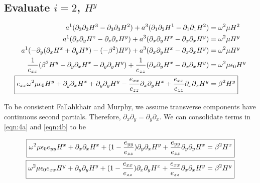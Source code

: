 \documentclass[letter]{article}
\begin{document}
	\subsection*{Evaluate $i=2$, $H^y$}
	
	\begin{align}
		a^1 (\partial_3 \partial_2 H^3 - \partial_3 \partial_3 H^2) + a^3 (\partial_1 \partial_2 H^1 - \partial_1 \partial_1 							H^2) &= \omega^2 \mu H^2 \\
		a^1 (\partial_z \partial_y H^z - \partial_z \partial_z H^y) + a^3 (\partial_x \partial_y H^x - \partial_x \partial_x 							H^y) &= \omega^2 \mu H^y \\
		a^1 ( - \partial_y (\partial_x H^x + \partial_y H^y) - (-\beta^2) H^y) + a^3 (\partial_x \partial_y H^x - \partial_x \partial_x H^y) &= \omega^2 \mu H^y \\
		\frac{1}{e_{xx}} (\beta^2 H^y - \partial_y \partial_x H^x - \partial_y \partial_y H^y) + \frac{1}{e_{zz}} (\partial_x \partial_y H^x - \partial_x \partial_x H^y) &= \omega^2 \mu \epsilon_0  H^y \\
		\Aboxed{e_{xx} \omega^2 \mu \epsilon_0 H^y + \partial_y \partial_x H^x + \partial_y \partial_y H^y - \frac{e_{xx}}{e_{zz}} \partial_x \partial_y H^x + \frac{e_{xx}}{e_{zz}} \partial_x \partial_x H^y &= \beta^2 H^y}
		\label{eqn:4b}
	\end{align}
	
	To be consistent Fallahkhair and Murphy, we assume transverse components have continuous second partials. Therefore, $\partial_x \partial_y = \partial_y \partial_x$. We can consolidate terms in \ref{eqn:4a} and \ref{eqn:4b} to be
	
	\begin{align}
		\Aboxed{\omega^2 \mu \epsilon_0 e_{yy} H^x + \partial_x\partial_x H^x + (1 - \frac{e_{yy}}{e_{zz}}) \partial_y \partial_x H^y + \frac{e_{yy}}{e_{zz}} \partial_y \partial_y H^x &= \beta^2 H^x} 
		\label{eqn:4a*}\\
		\Aboxed{\omega^2 \mu \epsilon_0 e_{xx} H^y + \partial_y \partial_y H^y + (1 - \frac{e_{xx}}{e_{zz}}) \partial_x \partial_y H^x + \frac{e_{xx}}{e_{zz}} \partial_x \partial_x H^y &= \beta^2 H^y}
		\label{eqn:4b*}
	\end{align}
	
\end{document}
